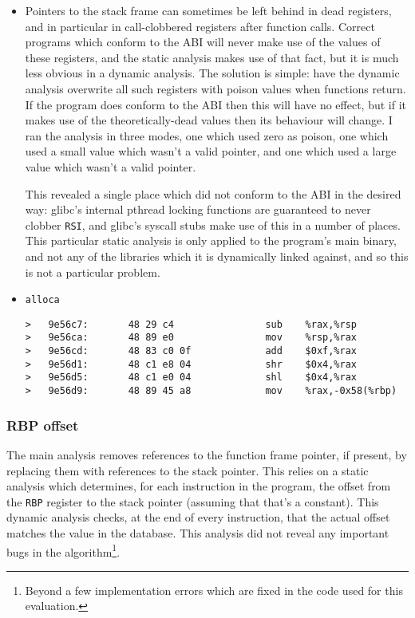 \begin{itemize}
\item
  Pointers to the stack frame can sometimes be left behind in dead registers, and in particular in call-clobbered registers after function calls.
  Correct programs which conform to the ABI will never make use of the values of these registers, and the static analysis makes use of that fact, but it is much less obvious in a dynamic analysis.
  The solution is simple: have the dynamic analysis overwrite all such registers with poison values when functions return.
  If the program does conform to the ABI then this will have no effect, but if it makes use of the theoretically-dead values then its behaviour will change.
  I ran the analysis in three modes, one which used zero as poison, one which used a small value which wasn't a valid pointer, and one which used a large value which wasn't a valid pointer.

  This revealed a single place which did not conform to the ABI in the desired way: glibc's internal pthread locking functions are guaranteed to never clobber \verb|RSI|, and glibc's syscall stubs make use of this in a number of places.
  This particular static analysis is only applied to the program's main binary, and not any of the libraries which it is dynamically linked against, and so this is not a particular problem.

\item
  \verb|alloca|

\begin{verbatim}
>   9e56c7:       48 29 c4                sub    %rax,%rsp
>   9e56ca:       48 89 e0                mov    %rsp,%rax
>   9e56cd:       48 83 c0 0f             add    $0xf,%rax
>   9e56d1:       48 c1 e8 04             shr    $0x4,%rax
>   9e56d5:       48 c1 e0 04             shl    $0x4,%rax
>   9e56d9:       48 89 45 a8             mov    %rax,-0x58(%rbp)
\end{verbatim}

\end{itemize}

\subsubsection{RBP offset}

The main analysis removes references to the function frame pointer, if
present, by replacing them with references to the stack pointer.  This
relies on a static analysis which determines, for each instruction in
the program, the offset from the \verb|RBP| register to the stack
pointer (assuming that that's a constant).  This dynamic analysis
checks, at the end of every instruction, that the actual offset
matches the value in the database.  This analysis did not reveal any
important bugs in the algorithm\footnote{Beyond a few implementation
  errors which are fixed in the code used for this evaluation.}.

